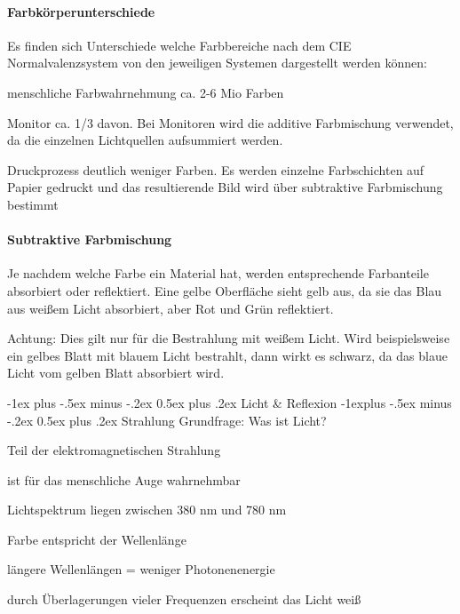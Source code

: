 \documentclass[landscape]{article}
\makeatletter
\renewcommand{\section}{\@startsection{section}{1}{0mm}%
                                {-1ex plus -.5ex minus -.2ex}%
                                {0.5ex plus .2ex}%
                                {\normalfont\large\bfseries}}
\renewcommand{\subsection}{\@startsection{subsection}{2}{0mm}%
                                {-1explus -.5ex minus -.2ex}%
                                {0.5ex plus .2ex}%
                                {\normalfont\normalsize\bfseries}}
\makeatother
\begin{document}
\begin{multicols}{3}
  \paragraph{Farbkörperunterschiede}
  Es finden sich Unterschiede welche Farbbereiche nach dem CIE Normalvalenzsystem von den jeweiligen Systemen dargestellt werden können:
  \begin{itemize*}
    \item menschliche Farbwahrnehmung ca. 2-6 Mio Farben
    \item Monitor ca. 1/3 davon. Bei Monitoren wird die additive Farbmischung verwendet, da die einzelnen Lichtquellen aufsummiert werden.
    \item Druckprozess deutlich weniger Farben. Es werden einzelne Farbschichten auf Papier gedruckt und das resultierende Bild wird über subtraktive Farbmischung bestimmt
  \end{itemize*}
  
  \paragraph{Subtraktive Farbmischung}
  Je nachdem welche Farbe ein Material hat, werden entsprechende Farbanteile absorbiert oder reflektiert. Eine gelbe Oberfläche sieht gelb aus, da sie das Blau aus weißem Licht absorbiert, aber Rot und Grün reflektiert.
  
  Achtung: Dies gilt nur für die Bestrahlung mit weißem Licht. Wird beispielsweise ein gelbes Blatt mit blauem Licht bestrahlt, dann wirkt es schwarz, da das blaue Licht vom gelben Blatt absorbiert wird.
  
  \section{Licht \& Reflexion}
  \subsection{ Strahlung}
  Grundfrage: Was ist Licht?
  \begin{itemize*}
    \item Teil der elektromagnetischen Strahlung
    \item ist für das menschliche Auge wahrnehmbar
    \item Lichtspektrum liegen zwischen 380 nm und 780 nm
    \item Farbe entspricht der Wellenlänge
    \item längere Wellenlängen = weniger Photonenenergie
    \item durch Überlagerungen vieler Frequenzen erscheint das Licht weiß
  \end{itemize*}
  

\end{multicols}
\end{document}
